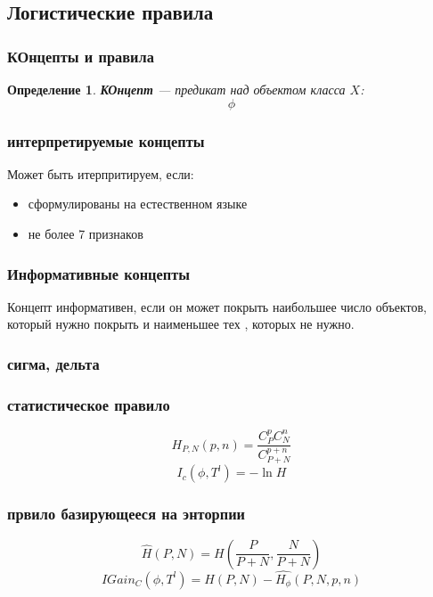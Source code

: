\documentclass[10pt,a4paper,oneside,titlepage]{report}
\theoremstyle{defenition}
\newtheorem*{defenition}{Определение}
\theoremstyle{theorem}
\begin{document}
\subsection{Логистические правила}

\subsubsection{КОнцепты и правила}

\begin{defenition}
	{\bfseries КОнцепт} --- предикат над объектом класса $X$:
	$$
	\phi
	$$
\end{defenition}

\subsubsection{интерпретируемые концепты}
Может быть итерпритируем, если:
\begin{itemize}
	\item сформулированы на естественном языке
	\item не более 7 признаков
\end{itemize}

\subsubsection{Информативные концепты}

Концепт информативен, если он может покрыть наибольшее число объектов, который нужно покрыть и наименьшее тех , которых не нужно.

\subsubsection{сигма, дельта}

\subsubsection{статистическое правило}

$$
H_{P, N}(p, n) = \frac{C_P^pC_N^n}{C_{P+N}^{p+n}}
$$
$$
I_c(\phi, T^l) = -\ln H
$$

\subsubsection{првило базирующееся на энторпии}

$$
\hat H(P, N) = H(\frac{P}{P + N}, \frac{N}{P + N})
$$
$$
$$
$$
IGain_C(\phi, T^l) = \hat H(P, N) - \hat{H_{\phi}}(P, N, p, n)
$$
\end{document}
